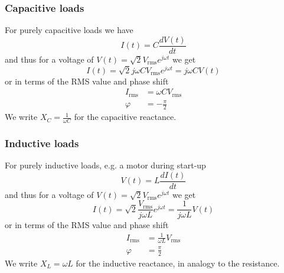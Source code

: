 \documentclass[10pt,dvipsnames]{beamer}
\begin{document}
\begin{frame}
  \frametitle{Capacitive loads}

  For purely \alert{capacitive loads} we have
  \begin{equation*}
       I(t) = C  \frac{dV(t)}{dt}
  \end{equation*}
  and thus for a voltage of $V(t) = \sqrt{2} V_{\textrm{rms}}
  e^{j\omega t}$ we get
  \begin{equation*}
    I(t) = \sqrt{2} j\omega C V_{\textrm{rms}} e^{j\omega t} = j\omega C V(t)
  \end{equation*}
  or in terms of the RMS value and phase shift
  \begin{align*}
    I_{\textrm{rms}} & = \omega C V_{\textrm{rms}} \\
    \varphi & = -\frac{\pi}{2}
  \end{align*}
  We write $X_{C} = \frac{1}{\omega C}$ for the \alert{capacitive reactance}.


\end{frame}




\begin{frame}
  \frametitle{Inductive loads}

  For purely \alert{inductive loads}, e.g. a motor during start-up
  \begin{equation*}
    V(t) = L \frac{d I(t)}{dt}
  \end{equation*}
  and thus for a voltage of $V(t) = \sqrt{2} V_{\textrm{rms}}
  e^{j\omega t}$ we get
  \begin{equation*}
    I(t) = \sqrt{2} \frac{V_{\textrm{rms}}}{j\omega L} e^{j\omega t} = \frac{1}{j\omega L}V(t)
  \end{equation*}
  or in terms of the RMS value and phase shift
  \begin{align*}
    I_{\textrm{rms}} & = \frac{1}{\omega L} V_{\textrm{rms}} \\
    \varphi & = \frac{\pi}{2}
  \end{align*}
  We write $X_{L} = \omega L$ for the \alert{inductive reactance}, in analogy to the resistance.


\end{frame}
\end{document}
